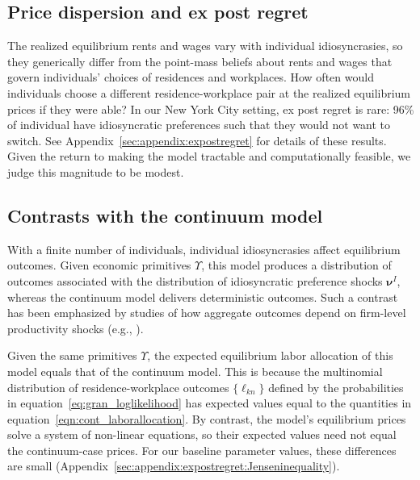 \documentclass[11pt]{article}
\theoremstyle{definition}
\newcommand\idiosyncraticphrase{idiosyncratic preference}
\begin{document}
\subsection{Price dispersion and ex post regret}\label{sec:finitemodel:regret}

The realized equilibrium rents and wages vary with individual idiosyncrasies,
so they generically differ
from the point-mass beliefs about rents and wages
that govern individuals' choices of residences and workplaces.
How often would individuals choose a different residence-workplace pair at the realized equilibrium prices if they were able?
In our New York City setting, ex post regret is rare:
96\% of individual have \idiosyncraticphrase s such that they would not want to switch.
See Appendix~\ref{sec:appendix:expostregret} for details of these results.
Given the return to making the model tractable and computationally feasible,
we judge this magnitude to be modest.

\subsection{Contrasts with the continuum model}\label{sec:finitemodel:counterfactuals}

With a finite number of individuals,
individual idiosyncrasies affect equilibrium outcomes.
Given economic primitives $\Upsilon$,
this model produces a distribution of outcomes associated with the distribution of idiosyncratic preference shocks $\boldsymbol \nu^{I}$,
whereas the continuum model delivers deterministic outcomes.
Such a contrast has been emphasized by studies of
how aggregate outcomes depend on firm-level productivity shocks
(e.g., \citealt{Gabaix:2011,GiovanniLevchenkoMejean:2014,EatonKortumSotelo:2013,GaubertItskhoki:2021}).

Given the same primitives $\Upsilon$,
the expected equilibrium labor allocation of this model
equals
that of the continuum model.
This is because
the multinomial distribution of residence-workplace outcomes $\{\ell_{kn}\}$
defined by the probabilities in equation~\eqref{eq:gran_loglikelihood}
has expected values equal to the quantities in equation~\eqref{eqn:cont_laborallocation}.
By contrast, the model's equilibrium prices solve a system of non-linear equations,
so their expected values need not equal the continuum-case prices.
For our baseline parameter values, these differences are small (Appendix~\ref{sec:appendix:expostregret:Jenseninequality}).
\end{document}
